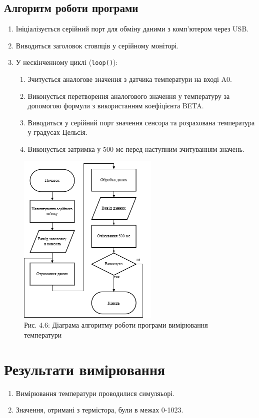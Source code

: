 \documentclass[a4paper]{article}
\begin{document}
\subsection*{Алгоритм роботи програми}
\begin{enumerate}
    \item Ініціалізується серійний порт для обміну даними з комп'ютером через USB.
    \item Виводиться заголовок стовпців у серійному моніторі.
    \item У нескінченному циклі (\texttt{loop()}):
    \begin{enumerate}
        \item Зчитується аналогове значення з датчика температури на вході A0.
        \item Виконується перетворення аналогового значення у температуру за допомогою формули з використанням коефіцієнта BETA.
        \item Виводиться у серійний порт значення сенсора та розрахована температура у градусах Цельсія.
        \item Виконується затримка у 500 мс перед наступним зчитуванням значень.
    \end{enumerate}
\end{enumerate}

\begin{figure}[h]
    \centering
    \includegraphics[width=0.6\textwidth]{imgs/LW4.01.drawio.png}
    \caption*{Рис. 4.6: Діаграма алгоритму роботи програми вимірювання температури}
\end{figure} 

\section*{Результати вимірювання}
\begin{enumerate}
    \item Вимірювання температури проводилися симуляьорі.
    \item Значення, отримані з термістора, були в межах 0-1023.
\end{enumerate}
\end{document}
